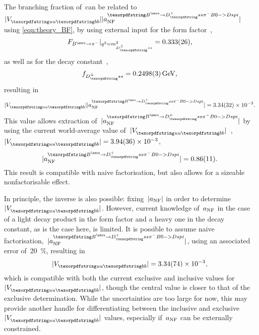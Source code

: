 The branching fraction of~\BdDsPi can be related to~\({\absx{\Vub} \absx{\aNF^{\BdDsPi}}}\) using \cref{eqn:theory_BF}, by using external input for the form factor~\cite{Ball:2004ye,Ball:2006jz},
%
\begin{equation}
    {F_{\decay{\Bd}{\pim}} |_{q^{2}=m_{\Dspm}^{2}} = \num{0.333 +- 0.026}} \rlap{,}
\end{equation}
%
as well as for the decay constant~\cite{Bazavov:2017lyh},
%
\begin{equation}
    {f_{\Dspm} = \SI{0.2498 +- 0.0003}{\GeV}} \rlap{,}
\end{equation}
%
resulting in
%
\begin{equation}
    {\absx{\Vub} \absx{\aNF^{\BdDsPi}} = \num{3.34 +- 0.32 e-3}} \rlap{.}
\end{equation}
%
This value allows extraction of~\(\absx{\aNF^{\BdDsPi}}\) by using the current world-average value of~\(\absx{\Vub}\)~\cite{PDG}, \({\absx{\Vub} = \num{3.94 +- 0.36 e-3}}\),
%
\begin{equation}
    \absx{\aNF^{\BdDsPi}} = \num{0.86 +- 0.11} \rlap{.}
\end{equation}
%
This result is compatible with naive factorisation, but also allows for a sizeable nonfactorisable effect.

In principle, the inverse is also possible: fixing~\({|a_{\text{NF}}|}\) in order to determine~\(\absx{\Vub}\).
However, current knowledge of~\(a_{\text{NF}}\) in the case of a light decay product in the form factor and a heavy one in the decay constant, as is the case here, is limited.
It is possible to assume naive factorisation,~\(\absx{\aNF^{\BdDsPi}}\), using an associated error of~\SI{20}{\percent}, resulting in
%
\begin{equation}
    \absx{\Vub} = \num{3.34 +- 0.74 e-3} \rlap{,}
\end{equation}
%
which is compatible with both the current exclusive and inclusive values for~\(\absx{\Vub}\), though the central value is closer to that of the exclusive determination.
While the uncertainties are too large for now, this may provide another handle for differentiating between the inclusive and exclusive~\(\absx{\Vub}\) values, especially if~\(a_{\text{NF}}\) can be externally constrained.

